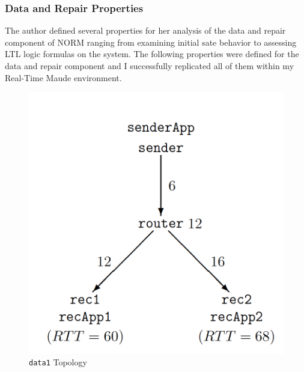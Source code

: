 \documentclass[10pt, journal]{IEEEtran}
\begin{document}
\subsubsection{Data and Repair Properties}

The author defined several properties for her analysis of the data and repair component of NORM ranging from examining initial sate behavior to assessing LTL logic formulas on the system. The following properties were defined for the data and repair component and I successfully replicated all of them within my Real-Time Maude environment.
\begin{figure}
	\includegraphics[width=\linewidth]{../DT_Topo1.png}
	\caption{\texttt{data1} Topology}
	\label{fig:data1}
\end{figure}
\end{document}
